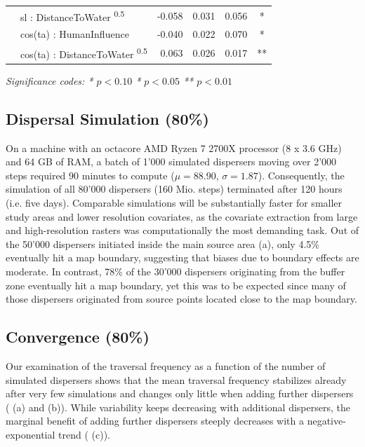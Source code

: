 \documentclass[abstract=on,10pt,a4paper,bibliography=totocnumbered]{article}
\begin{document}
\begin{table}
\begin{center}
{\begin{threeparttable}
\begin{tabular}{llrrrc}
         & sl : DistanceToWater \textsuperscript{0.5} & -0.058 & 0.031 & 0.056 & * \\
         & cos(ta) : HumanInfluence & -0.040 & 0.022 & 0.070 & * \\
         & cos(ta) : DistanceToWater \textsuperscript{0.5} & 0.063 & 0.026 & 0.017 & ** \\
         \bottomrule
      \end{tabular}
       \begin{tablenotes}
         \item \textit{Significance codes: * \(p < 0.10\) \quad ** \(p < 0.05\)
         \quad *** \(p < 0.01\)}
       \end{tablenotes}
    \end{threeparttable}
    }
  \end{center}
\end{table}

\subsection{Dispersal Simulation (80\%)}
On a machine with an octacore AMD Ryzen 7 2700X processor (8 x 3.6 GHz) and 64
GB of RAM, a batch of 1'000 simulated dispersers moving over 2'000 steps
required 90 minutes to compute (\(\mu = 88.90\), \(\sigma = 1.87\)).
Consequently, the simulation of all 80'000 dispersers (160 Mio. steps)
terminated after 120 hours (i.e. five days). Comparable simulations will be
substantially faster for smaller study areas and lower resolution covariates, as
the covariate extraction from large and high-resolution rasters was
computationally the most demanding task. Out of the 50'000 dispersers initiated
inside the main source area (a), only 4.5\% eventually hit a
map boundary, suggesting that biases due to boundary effects are moderate. In
contrast, 78\% of the 30'000 dispersers originating from the buffer zone
eventually hit a map boundary, yet this was to be expected since many of those
dispersers originated from source points located close to the map boundary.

\subsection{Convergence (80\%)}
Our examination of the traversal frequency as a function of the number of
simulated dispersers shows that the mean traversal frequency stabilizes already
after very few simulations and changes only little when adding further
dispersers ( (a) and (b)). While variability keeps decreasing
with additional dispersers, the marginal benefit of adding further dispersers
steeply decreases with a negative-exponential trend ( (c)).
\end{document}
